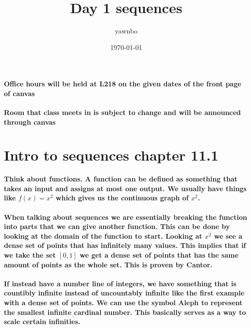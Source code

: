 \documentclass[a4paper]{article}
\title{Day 1 sequences}
\author{yawnbo}
\date{\today}
\begin{document}
\paragraph{Office hours will be held at L218 on the given dates of the front page of canvas}%
\label{par:Office hours will be held at L218 on the given dates of the front page of canvas}
\paragraph{Room that class meets in is subject to change and will be announced through canvas }%
\label{par:Room that class meets in is subject to change and will be announced through canvas }

\section{Intro to sequences chapter 11.1}%
\label{sec:Intro to sequences}

\paragraph{Think about functions. A function can be defined as something that takes an input and assigns at most one output. We usually have things like $f\left( x \right) = x^2$ which gives us the continuous graph of $x^2$. }

\paragraph{When talking about sequences we are essentially breaking the function into parts that we can give another function. This can be done by looking at the domain of the function to start. Looking at $x^2$ we see a dense set of points that has infinitely many values. This implies that if we take the set $\left[ 0,1 \right] $ we get a dense set of points that has the same amount of points as the whole set. This is proven by Cantor. }

\paragraph{If instead have a number line of integers, we have something that is countibly infinite instead of uncountably infinite like the first example with a dense set of points. We can use the symbol Aleph to represent the smallest infinite cardinal number. This basically serves as a way to scale certain infinities.}
\end{document}
